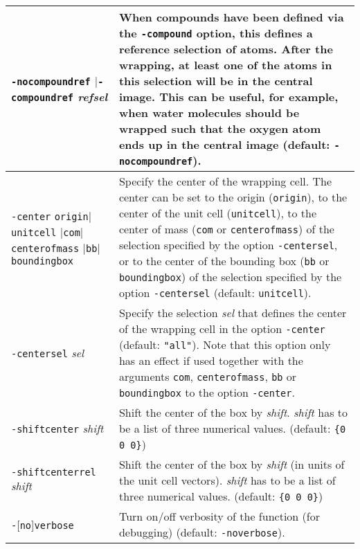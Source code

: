 \documentclass[a4paper, DIV12]{scrartcl}
\begin{document}
\begin{longtable}{|p{}|p{}|}
\texttt{-nocompoundref} $|$\texttt{-compoundref} \textit{refsel}
& When compounds have been defined via the \texttt{-compound} option,
this defines a reference selection of atoms. After the wrapping, at
least one of the atoms in this selection will be in the central
image. This can be useful, for example, when water molecules should be
wrapped such that the oxygen atom ends up in the central image
(default: \texttt{-nocompoundref}).
\\ \hline

\texttt{-center} \texttt{origin}$|$\texttt{unitcell}\linebreak
\hspace*{1em}$|$\texttt{com}$|$\texttt{centerofmass}\linebreak 
\hspace*{1em}$|$\texttt{bb}$|$\texttt{boundingbox}
& Specify the center of the wrapping cell. The center can be set to
the origin (\texttt{origin}), to the center of the unit cell
(\texttt{unitcell}), to the center of mass (\texttt{com} or
\texttt{centerofmass}) of the selection specified by the option
\texttt{-centersel}, or to the center of the bounding box (\texttt{bb}
or \texttt{boundingbox}) of the selection specified by the option
\texttt{-centersel} (default: \texttt{unitcell}).
\\ \hline

\texttt{-centersel} \textit{sel}
& Specify the selection \textit{sel} that defines the center of the
wrapping cell in the option \texttt{-center} (default:
\texttt{"all"}). Note that this option only has an effect if used
together with the arguments \texttt{com}, \texttt{centerofmass},
\texttt{bb} or \texttt{boundingbox} to the option \texttt{-center}.
\\ \hline

\texttt{-shiftcenter} \textit{shift}
& Shift the center of the box by \textit{shift}. \textit{shift} has to
be a list of three numerical values. (default: \verb!{0 0 0}!)
\\ \hline

\texttt{-shiftcenterrel} \textit{shift}
& Shift the center of the box by \textit{shift} (in units of
the unit cell vectors). \textit{shift} has to be a list of
three numerical values. (default: \verb!{0 0 0}!)
\\ \hline

\texttt{-}[\texttt{no}]\texttt{verbose}
& Turn on/off verbosity of the function (for debugging) (default:
\texttt{-noverbose}).
\\ \hline

\end{longtable}
\end{document}
